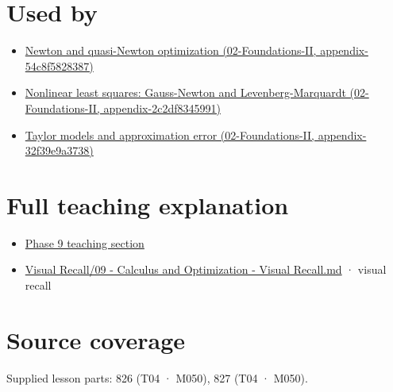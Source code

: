 \section{Used by}\label{appendix-6ac071f8b50c-used-by}

\begin{itemize}
\tightlist
\item
  \href{../02-Foundations-II/main.pdf\#nameddest=appendix-54c8f5828387}{Newton and quasi-Newton optimization (02-Foundations-II, appendix-54c8f5828387)}
\item
  \href{../02-Foundations-II/main.pdf\#nameddest=appendix-2c2df8345991}{Nonlinear least squares: Gauss-Newton and Levenberg-Marquardt (02-Foundations-II, appendix-2c2df8345991)}
\item
  \href{../02-Foundations-II/main.pdf\#nameddest=appendix-32f39e9a3738}{Taylor models and approximation error (02-Foundations-II, appendix-32f39e9a3738)}
\end{itemize}

\section{Full teaching explanation}\label{appendix-6ac071f8b50c-full-teaching-explanation}

\begin{itemize}
\tightlist
\item
  \href{Continuous\%20Notes/Computing\%20Foundations\%20-\%20From\%20Bits\%20to\%20C++\%20and\%20Systems\%20APIs\#Jacobians,\%20curvature,\%20and\%20local\%20approximation}{Phase 9 teaching section}
\item
  \hyperref[appendix-adf48f5dc5c1]{Visual Recall/09 - Calculus and Optimization - Visual Recall.md} · visual recall
\end{itemize}

\section{Source coverage}\label{appendix-6ac071f8b50c-source-coverage}

Supplied lesson parts: 826 (T04 · M050), 827 (T04 · M050).
